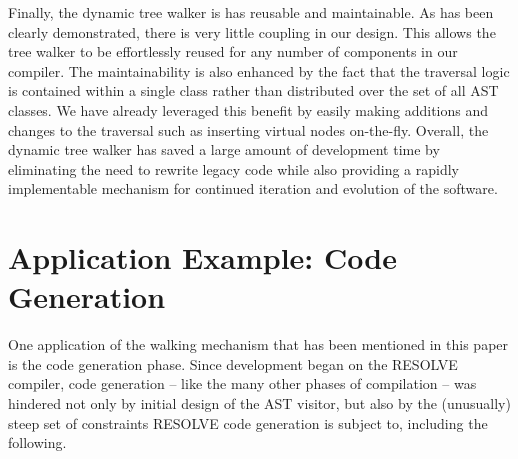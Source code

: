 \documentclass[times]{speauth}
\begin{document}
Finally, the dynamic tree walker is has reusable and maintainable. As has been clearly demonstrated, there is very little coupling in our design. This allows the tree walker to be effortlessly reused for any number of components in our compiler. The maintainability is also enhanced by the fact that the traversal logic is contained within a single class rather than distributed over the set of all AST classes. We have already leveraged this benefit by easily making additions and changes to the traversal such as inserting virtual nodes on-the-fly. Overall, the dynamic tree walker has saved a large amount of development time by eliminating the need to rewrite legacy code while also providing a rapidly implementable mechanism for continued iteration and evolution of the software.


\section{Application Example: Code Generation}
\vspace{-2pt}

One application of the walking mechanism that has been mentioned in this paper is the code generation phase. Since development began on the RESOLVE compiler, code generation -- like the many other phases of compilation -- was hindered not only by initial design of the AST visitor, but also by the (unusually) steep set of constraints RESOLVE code generation is subject to, including the following.
\end{document}
